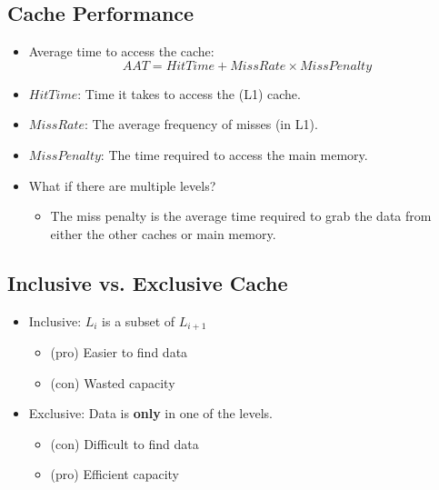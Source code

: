 \documentclass[10pt]{article}
\begin{document}
\subsection*{Cache Performance}
\begin{itemize}
    \item Average time to access the cache:
    \[AAT = HitTime + MissRate \times MissPenalty\]
    \item $HitTime$: Time it takes to access the (L1) cache.
    \item $MissRate$: The average frequency of misses (in L1).
    \item $MissPenalty$: The time required to access the main memory.
    \item What if there are multiple levels?
    \begin{itemize}
        \item The miss penalty is the average time required to grab the data from either the other caches or main memory.
    \end{itemize}
\end{itemize}

\subsection*{Inclusive vs. Exclusive Cache}
\begin{itemize}
    \item Inclusive: $L_i$ is a subset of $L_{i + 1}$
    \begin{itemize}
        \item (pro) Easier to find data
        \item (con) Wasted capacity
    \end{itemize}
    \item Exclusive: Data is \textbf{only} in one of the levels.
    \begin{itemize}
        \item (con) Difficult to find data
        \item (pro) Efficient capacity
    \end{itemize}
\end{itemize}
\end{document}
